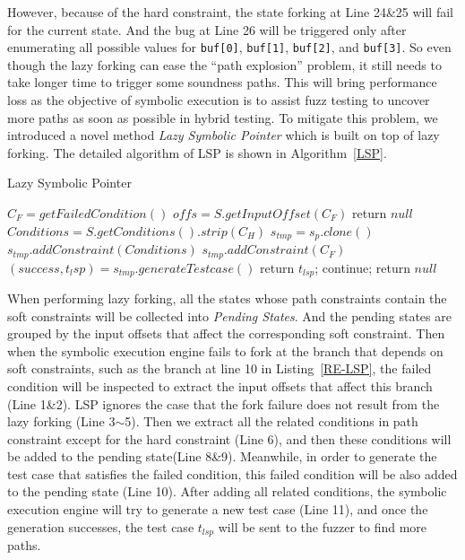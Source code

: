 However, because of the hard constraint, the state forking at Line 24\&25 will fail for the current state. And the bug at Line 26 will be triggered only after enumerating all possible values for \texttt{buf[0]}, \texttt{buf[1]}, \texttt{buf[2]}, and \texttt{buf[3]}. So even though the lazy forking can ease the ``path explosion'' problem, it still needs to take longer time to trigger some soundness paths. This will bring performance loss as the objective of symbolic execution is to assist fuzz testing to uncover more paths as soon as possible in hybrid testing. 
To mitigate this problem, we introduced a novel method \emph{Lazy Symbolic Pointer} which is built on top of lazy forking. The detailed algorithm of LSP is shown in Algorithm~\ref{LSP}.

\begin{algorithm}
  \caption{Lazy Symbolic Pointer}
  \label{LSP}
  $C_F = getFailedCondition()$\;
  $offs = S.getInputOffset(C_F)$\;
  {
    return $null$\;
  }
  $Conditions = S.getConditions().strip(C_H)$\;
  {
    $s_{tmp} = s_p.clone()$\;
    $s_{tmp}.addConstraint(Conditions)$\;
    $s_{tmp}.addConstraint(C_F)$\;
    $(success, t_lsp) = s_{tmp}.generateTestcase()$\;
    {
      return $t_{lsp}$;
    } {
      continue;
    }
  }
  return $null$\;
\end{algorithm}
  
When performing lazy forking, all the states whose path constraints contain the soft constraints will be collected into \emph{Pending States}. And the pending states are grouped by the input offsets that affect the corresponding soft constraint. %
Then when the symbolic execution engine fails to fork at the branch that depends on soft constraints, such as the branch at line 10 in Listing~\ref{RE-LSP}, the failed condition will be inspected to extract the input offsets that affect this branch (Line 1\&2). LSP ignores the case that the fork failure does not result from the lazy forking (Line 3$\sim$5). Then we extract all the related conditions in path constraint except for the hard constraint (Line 6), and then these conditions will be added to the pending state(Line 8\&9). Meanwhile, in order to generate the test case that satisfies the failed condition, this failed condition will be also added to the pending state (Line 10). After adding all related conditions, the symbolic execution engine will try to generate a new test case (Line 11), and once the generation successes, the test case $t_{lsp}$ will be sent to the fuzzer to find more paths.

